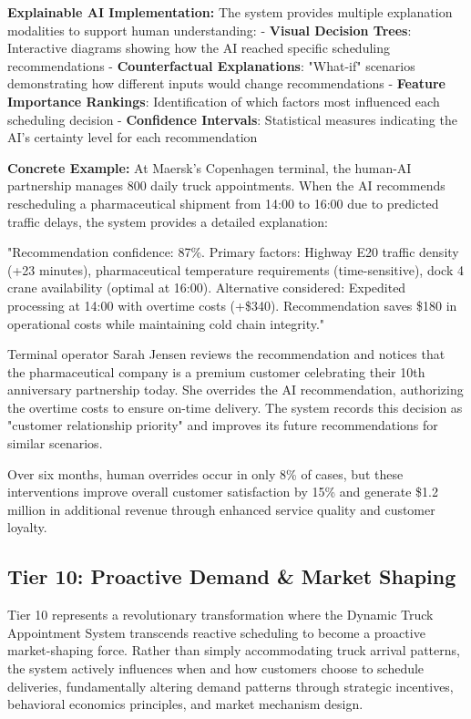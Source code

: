 \documentclass{article}
\begin{document}
\textbf{Explainable AI Implementation:} The system provides multiple explanation modalities to support human understanding:
- \textbf{Visual Decision Trees}: Interactive diagrams showing how the AI reached specific scheduling recommendations
- \textbf{Counterfactual Explanations}: "What-if" scenarios demonstrating how different inputs would change recommendations
- \textbf{Feature Importance Rankings}: Identification of which factors most influenced each scheduling decision
- \textbf{Confidence Intervals}: Statistical measures indicating the AI's certainty level for each recommendation

\textbf{Concrete Example:} At Maersk's Copenhagen terminal, the human-AI partnership manages 800 daily truck appointments. When the AI recommends rescheduling a pharmaceutical shipment from 14:00 to 16:00 due to predicted traffic delays, the system provides a detailed explanation:

"Recommendation confidence: 87\%. Primary factors: Highway E20 traffic density (+23 minutes), pharmaceutical temperature requirements (time-sensitive), dock 4 crane availability (optimal at 16:00). Alternative considered: Expedited processing at 14:00 with overtime costs (+\$340). Recommendation saves \$180 in operational costs while maintaining cold chain integrity."

Terminal operator Sarah Jensen reviews the recommendation and notices that the pharmaceutical company is a premium customer celebrating their 10th anniversary partnership today. She overrides the AI recommendation, authorizing the overtime costs to ensure on-time delivery. The system records this decision as "customer relationship priority" and improves its future recommendations for similar scenarios.

Over six months, human overrides occur in only 8\% of cases, but these interventions improve overall customer satisfaction by 15\% and generate \$1.2 million in additional revenue through enhanced service quality and customer loyalty.

\subsection{Tier 10: Proactive Demand \& Market Shaping}

Tier 10 represents a revolutionary transformation where the Dynamic Truck Appointment System transcends reactive scheduling to become a proactive market-shaping force. Rather than simply accommodating truck arrival patterns, the system actively influences when and how customers choose to schedule deliveries, fundamentally altering demand patterns through strategic incentives, behavioral economics principles, and market mechanism design.
\end{document}
